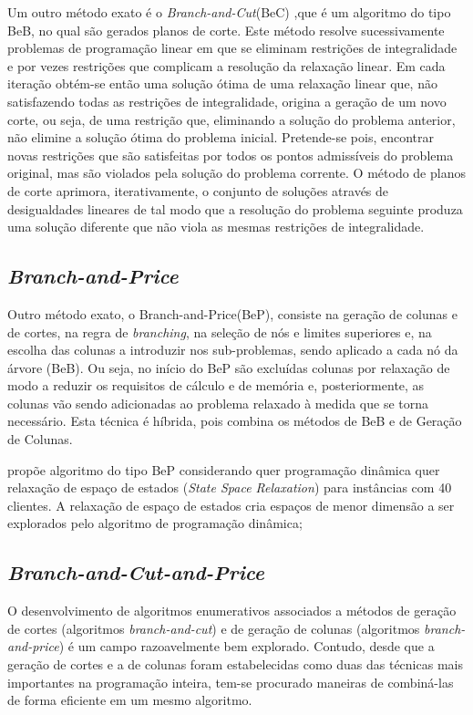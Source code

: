 Um outro método exato é o \textit{Branch-and-Cut}(BeC) \cite{lieberman10},que é um algoritmo do tipo BeB, no qual são gerados planos de corte. Este método resolve sucessivamente problemas de programação linear em que se eliminam restrições de integralidade e por vezes restrições que complicam a resolução da relaxação linear. Em cada iteração obtém-se então uma solução ótima de uma relaxação linear que, não satisfazendo todas as restrições de integralidade, origina a geração de um novo corte, ou seja, de uma restrição que, eliminando a solução do problema anterior, não elimine a solução ótima do problema inicial. Pretende-se pois, encontrar novas restrições que são satisfeitas por todos os pontos admissíveis do problema original, mas são violados pela solução do problema corrente. O método de planos de corte aprimora, iterativamente, o conjunto de soluções através de desigualdades lineares de tal modo que a resolução do problema seguinte produza uma solução diferente que não viola as mesmas restrições de integralidade.


\subsection{\textit{Branch-and-Price}}

Outro método exato, o Branch-and-Price(BeP), consiste na geração de colunas e de cortes, na regra de \textit{branching}, na seleção de nós e limites superiores e, na escolha das colunas a introduzir nos sub-problemas, sendo aplicado a cada nó da árvore (BeB). Ou seja, no início do BeP são excluídas colunas por relaxação de modo a reduzir os requisitos de cálculo e de memória e, posteriormente, as colunas vão sendo adicionadas ao problema relaxado à medida que se torna necessário. Esta técnica é híbrida, pois combina os métodos de BeB e de Geração de Colunas. 

\cite{dellamico06} propõe algoritmo do tipo BeP considerando quer programação dinâmica quer relaxação de espaço de estados (\textit{State Space Relaxation}) para instâncias com 40 clientes. A relaxação de espaço de estados cria espaços de menor dimensão a ser explorados pelo algoritmo de programação dinâmica;

\subsection{\textit{Branch-and-Cut-and-Price}}


O desenvolvimento de algoritmos enumerativos associados a métodos de geração de cortes (algoritmos \textit{branch-and-cut}) e de geração de colunas (algoritmos \textit{branch-and-price}) é um campo razoavelmente bem explorado. Contudo, desde que a geração de cortes e a de colunas foram estabelecidas como duas das técnicas mais importantes na programação inteira, tem-se procurado maneiras de combiná-las de forma eficiente em um mesmo algoritmo. 

